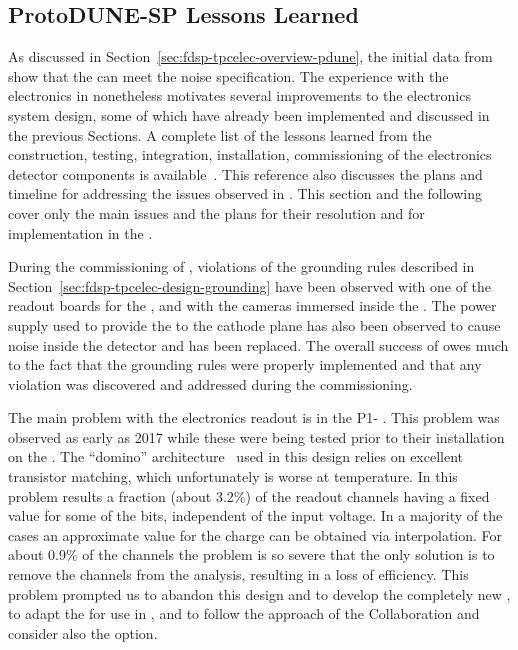 \subsection{ProtoDUNE-SP Lessons Learned}
\label{sec:fdsp-tpcelec-overview-lessons}

As discussed in Section~\ref{sec:fdsp-tpcelec-overview-pdune}, the initial 
data from  show that the  can meet the noise specification. 
The experience with the  electronics in  nonetheless motivates 
several improvements to the  electronics system design, some of which
have already been implemented and discussed in the previous Sections.
A complete list of the lessons learned from the construction, testing, integration,
installation, commissioning of the  electronics detector components
is available~\cite{bib:docdb12367}. This reference also discusses
the plans and timeline for addressing the issues observed in . 
This  section and the following cover only the main issues 
and the plans for their resolution and for implementation in the . 

During the commissioning of , violations of the
grounding rules described in Section~\ref{sec:fdsp-tpcelec-design-grounding}
have been observed with one of the readout
boards for the , and with the cameras immersed
inside the \lar. The power supply used to provide the  to the 
cathode plane has also been observed
to cause noise inside the detector and has been replaced.
The overall success of  owes much to the fact that the
grounding rules were properly implemented
and that any violation was discovered and addressed during
the commissioning.

The main problem with the   electronics readout is in the
P1- . This problem was observed as early as 2017 
while these  were being tested prior to their installation
on the . The ``domino'' architecture~\cite{dominoADC} used in this design relies on
excellent transistor matching, which unfortunately 
is worse at  temperature. In  this problem
results a fraction (about \num{3.2}\%) of the readout channels having a fixed value for some of
the  bits, independent of the input voltage. In a majority
of the cases an approximate value for the charge can be obtained via
interpolation. For about \num{0.9}\% of the channels the problem is
so severe that the only solution is to remove the channels from the
analysis, resulting in a loss of efficiency. This problem prompted us to abandon
this design and to develop the completely new , to
adapt the   for use in , and to
follow the approach of the  Collaboration and consider
also the   option.


